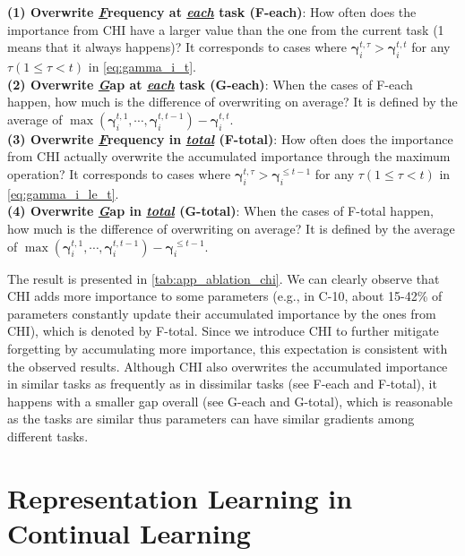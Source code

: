 \textbf{(1) Overwrite \underline{\textit{F}}requency at \underline{\textit{each}} task (F-each)}:
How often does the importance from CHI have a larger value than the one from the current task (1 means that it always happens)? It corresponds to cases where $\bm{\gamma}_i^{t,\tau} > \bm{\gamma}_i^{t,t}$ for any $\tau (1 \le \tau < t)$ in \cref{eq:gamma_i_t}. 
\\
\textbf{(2) Overwrite \underline{\textit{G}}ap at \underline{\textit{each}} task (G-each)}:
When the cases of F-each happen, how much is the difference of overwriting on average? It is defined by the average of $\max{(\bm{\gamma}_i^{t,1},\cdots,\bm{\gamma}_i^{t,t-1})} - \bm{\gamma}_i^{t,t}$.
\\
\textbf{(3) Overwrite \underline{\textit{F}}requency in \underline{\textit{total}} (F-total)}:
How often does the importance from CHI actually overwrite the accumulated importance through the maximum operation? It corresponds to cases where $\bm{\gamma}_i^{t,\tau} > \bm{\gamma}_i^{\le t-1}$ for any $\tau (1 \le \tau < t)$ in \cref{eq:gamma_i_le_t}. 
\\
\textbf{(4) Overwrite \underline{\textit{G}}ap in \underline{\textit{total}} (G-total)}:
When the cases of F-total happen, how much is the difference of overwriting on average? It is defined by the average of $\max{(\bm{\gamma}_i^{t,1},\cdots,\bm{\gamma}_i^{t,t-1})} - \bm{\gamma}_i^{\le t-1}$.

The result is presented in \cref{tab:app_ablation_chi}.
We can clearly observe that CHI adds more importance to some parameters (e.g., in C-10, about 15-42\% of parameters constantly update their accumulated importance by the ones from CHI), which is denoted by F-total. Since we introduce CHI to further mitigate forgetting by accumulating more importance, this expectation is consistent with the observed results. Although CHI also overwrites the accumulated importance in similar tasks as frequently as in dissimilar tasks (see F-each and F-total), it happens with a smaller gap overall (see G-each and G-total), which is reasonable as the tasks are similar thus parameters can have similar gradients among different tasks.













\section{Representation Learning in Continual Learning} \label{sec:app_representation}







